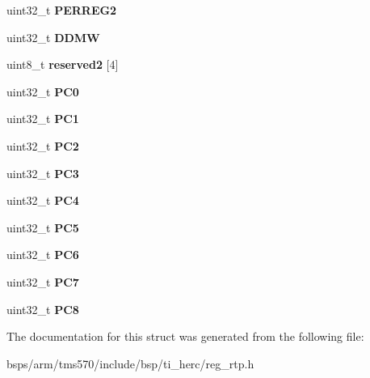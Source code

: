 \begin{DoxyCompactItemize}
\item 
\mbox{\label{structtms570__rtp__t_a762c66b32fd7c648fc383b5bc64e6557}} 
uint32\+\_\+t {\bfseries P\+E\+R\+R\+E\+G2}
\item 
\mbox{\label{structtms570__rtp__t_a26b6bfe2b694402cf6af1ef43e660040}} 
uint32\+\_\+t {\bfseries D\+D\+MW}
\item 
\mbox{\label{structtms570__rtp__t_a5ef499d6711a75de6a8f446e0b089a8d}} 
uint8\+\_\+t {\bfseries reserved2} \mbox{[}4\mbox{]}
\item 
\mbox{\label{structtms570__rtp__t_a6363ee2447d22e5259f7174be1ae71c4}} 
uint32\+\_\+t {\bfseries P\+C0}
\item 
\mbox{\label{structtms570__rtp__t_a3ac6538be20e487e136bcf851c46b61b}} 
uint32\+\_\+t {\bfseries P\+C1}
\item 
\mbox{\label{structtms570__rtp__t_ac093cb4aff2d8319fc06052a9d8e2425}} 
uint32\+\_\+t {\bfseries P\+C2}
\item 
\mbox{\label{structtms570__rtp__t_a972306f6b7a6568ab8004318f51e35ae}} 
uint32\+\_\+t {\bfseries P\+C3}
\item 
\mbox{\label{structtms570__rtp__t_a7ad29532b836cfa89a007a6e5c3bd13b}} 
uint32\+\_\+t {\bfseries P\+C4}
\item 
\mbox{\label{structtms570__rtp__t_ab820c5583cacc45e93ed82bfe6828fee}} 
uint32\+\_\+t {\bfseries P\+C5}
\item 
\mbox{\label{structtms570__rtp__t_a4625ae93be7d380f75d72a5c7246d290}} 
uint32\+\_\+t {\bfseries P\+C6}
\item 
\mbox{\label{structtms570__rtp__t_a15da70e34e38e61e2e375ad7e7006c95}} 
uint32\+\_\+t {\bfseries P\+C7}
\item 
\mbox{\label{structtms570__rtp__t_a7fc80422771aaa413b16fc0bc8a7fb79}} 
uint32\+\_\+t {\bfseries P\+C8}
\end{DoxyCompactItemize}


The documentation for this struct was generated from the following file\+:\begin{DoxyCompactItemize}
\item 
bsps/arm/tms570/include/bsp/ti\+\_\+herc/reg\+\_\+rtp.\+h\end{DoxyCompactItemize}
